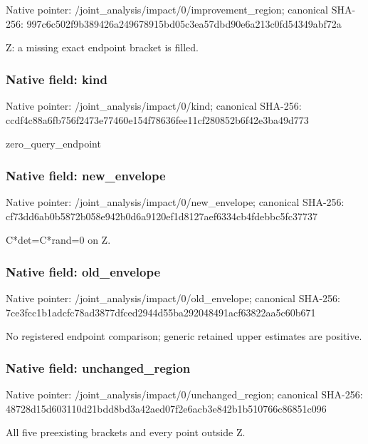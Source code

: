 \documentclass[10pt,a4paper]{article}
\begin{document}
Native pointer: /joint\_analysis/impact/0\allowbreak{}/improvement\_region; canonical SHA-256: 997c6c502f9b389426a24967\allowbreak{}8915bd05c3ea57dbd90e6a21\allowbreak{}3c0fd54349abf72a


Z: a missing exact endpoint bracket is filled.


\subsubsection{Native field: kind}


Native pointer: /joint\_analysis/impact/0/kind; canonical SHA-256: ccdf4c88a6fb756f2473e774\allowbreak{}60e154f78636fee11cf28085\allowbreak{}2b6f42e3ba49d773


zero\_query\_endpoint


\subsubsection{Native field: new\_envelope}


Native pointer: /joint\_analysis/impact/0/new\_envelope; canonical SHA-256: cf73dd6ab0b5872b058e942b\allowbreak{}0d6a9120ef1d8127aef6334c\allowbreak{}b4fdebbc5fc37737


C*det=C*rand=0 on Z.


\subsubsection{Native field: old\_envelope}


Native pointer: /joint\_analysis/impact/0/old\_envelope; canonical SHA-256: 7ce3fcc1b1adcfc78ad3877d\allowbreak{}fced2944d55ba292048491ac\allowbreak{}f63822aa5c60b671


No registered endpoint comparison; generic retained upper estimates are positive.


\subsubsection{Native field: unchanged\_region}


Native pointer: /joint\_analysis/impact/0\allowbreak{}/unchanged\_region; canonical SHA-256: 48728d15d603110d21bdd8bd\allowbreak{}3a42aed07f2e6acb3e842b1b\allowbreak{}510766c86851c096


All five preexisting brackets and every point outside Z.
\end{document}
